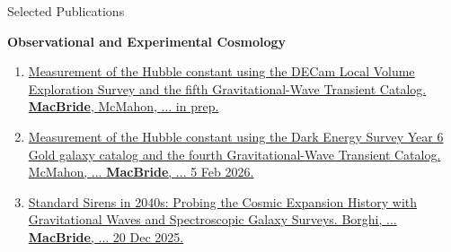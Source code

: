 \begin{rSection}{Selected Publications}
\begin{rSubsection}{\textbf{Observational and Experimental Cosmology}}{}{}{}
\begin{enumerate}
    \item \href{}{Measurement of the Hubble constant using the DECam Local Volume Exploration Survey and the fifth Gravitational-Wave Transient Catalog. \textbf{MacBride}, McMahon, ... in prep.}
    \item \href{https://arxiv.org/pdf/2602.04766}{Measurement of the Hubble constant using the Dark Energy Survey Year 6 Gold galaxy catalog and the fourth Gravitational-Wave Transient Catalog. McMahon, ... \textbf{MacBride}, ... 5 Feb 2026.}
    \item \href{https://arxiv.org/pdf/2512.18369}{Standard Sirens in 2040s: Probing the Cosmic Expansion History with Gravitational Waves and Spectroscopic Galaxy Surveys. Borghi, ... \textbf{MacBride}, ... 20 Dec 2025.}


\end{enumerate}
\end{rSubsection}


\end{rSection}
